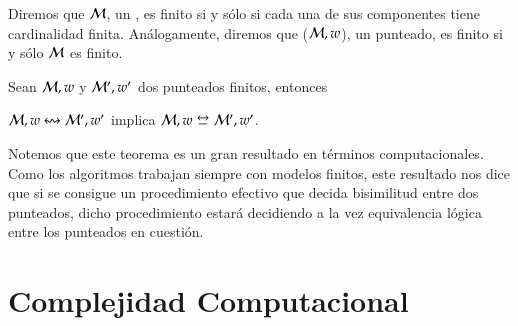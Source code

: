Diremos que $\mathcal{M}$, un \ults, es finito si y sólo si cada una de sus componentes tiene cardinalidad finita. Análogamente, diremos que 
($\mathcal{M},w$), un \ults punteado, es finito si y sólo $\mathcal{M}$ es finito. 

\begin{teorema}\label{thm:finite-equivalence-implies-bisim}
    Sean $\mathcal{M},w$ y $\mathcal{M}',w'$ dos \ultss punteados finitos, entonces
    \begin{center}
        $\mathcal{M},w \mathrel{\leftrightsquigarrow} \mathcal{M}', w'$ implica $\model,w \bisim \model', w'$.
    \end{center}
\end{teorema}

Notemos que este teorema es un gran resultado en términos computacionales. Como los algoritmos trabajan siempre con modelos finitos, este resultado
nos dice que si se consigue un procedimiento efectivo que decida bisimilitud entre dos \ultss punteados, dicho procedimiento estará decidiendo a la vez
equivalencia lógica entre los \ultss punteados en cuestión.


\section{Complejidad Computacional}